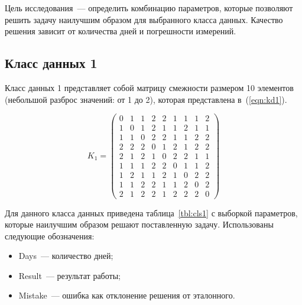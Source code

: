 Цель исследования~--- определить комбинацию параметров, которые позволяют решить задачу наилучшим образом для выбранного класса данных.
Качество решения зависит от количества дней и погрешности измерений.

\subsection{Класс данных 1}
\label{par:class1}

Класс данных 1 представляет собой матрицу смежности размером 10 элементов (небольшой разброс значений: от 1 до 2), которая представлена в~(\ref{eqn:kd1}).

\begin{equation}
	\label{eqn:kd1}
	K_{1} = \begin{pmatrix}
		0 & 1 & 1 & 2 & 2 & 1 & 1 & 1 & 2 \\ 
		1 & 0 & 1 & 2 & 1 & 1 & 2 & 1 & 1 \\ 
		1 & 1 & 0 & 2 & 2 & 1 & 1 & 2 & 2 \\ 
		2 & 2 & 2 & 0 & 1 & 2 & 1 & 2 & 2 \\ 
		2 & 1 & 2 & 1 & 0 & 2 & 2 & 1 & 1 \\ 
		1 & 1 & 1 & 2 & 2 & 0 & 1 & 1 & 2 \\ 
		1 & 2 & 1 & 1 & 2 & 1 & 0 & 2 & 2 \\ 
		1 & 1 & 2 & 2 & 1 & 1 & 2 & 0 & 2 \\ 
		2 & 1 & 2 & 2 & 1 & 2 & 2 & 2 & 0 
	\end{pmatrix}
\end{equation}

Для данного класса данных приведена таблица~\ref{tbl:cls1} с выборкой параметров, которые наилучшим образом решают поставленную задачу. Использованы следующие обозначения: 
\begin{itemize}
	\item Days~--- количество дней;
	\item Result~--- результат работы;
	\item Mistake~--- ошибка как отклонение решения от эталонного.
\end{itemize}

